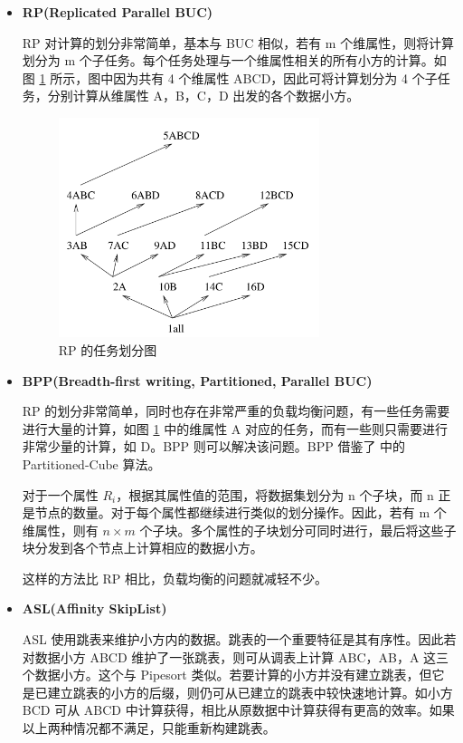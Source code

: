 \begin{itemize}

\item \textbf{RP(Replicated Parallel BUC)}

RP 对计算的划分非常简单，基本与 BUC 相似，若有 m 个维属性，则将计算划分为 m 个子任务。每个任务处理与一个维属性相关的所有小方的计算。如图 \ref{cluster_rp} 所示，图中因为共有 4 个维属性 ABCD，因此可将计算划分为 4 个子任务，分别计算从维属性 A，B，C，D 出发的各个数据小方。

\begin{figure}[!htb]
\centering\includegraphics[width=3in]{picture/ch_current_research/cluster_rp} 
\caption{RP 的任务划分图}\label{cluster_rp} 
\end{figure} 

\item \textbf{BPP(Breadth-first writing, Partitioned, Parallel BUC)}

RP 的划分非常简单，同时也存在非常严重的负载均衡问题，有一些任务需要进行大量的计算，如图 \ref{cluster_rp} 中的维属性 A 对应的任务，而有一些则只需要进行非常少量的计算，如 D。BPP 则可以解决该问题。BPP 借鉴了 \cite{ross1997fast} 中的 Partitioned-Cube 算法。

对于一个属性 ${R}_{i}$，根据其属性值的范围，将数据集划分为 n 个子块，而 n 正是节点的数量。对于每个属性都继续进行类似的划分操作。因此，若有 m 个维属性，则有 $n \times m$ 个子块。多个属性的子块划分可同时进行，最后将这些子块分发到各个节点上计算相应的数据小方。

这样的方法比 RP 相比，负载均衡的问题就减轻不少。

\item \textbf{ASL(Affinity SkipList)}

ASL 使用跳表来维护小方内的数据。跳表的一个重要特征是其有序性。因此若对数据小方 ABCD 维护了一张跳表，则可从调表上计算 ABC，AB，A 这三个数据小方。这个与 Pipesort 类似。若要计算的小方并没有建立跳表，但它是已建立跳表的小方的后缀，则仍可从已建立的跳表中较快速地计算。如小方 BCD 可从 ABCD 中计算获得，相比从原数据中计算获得有更高的效率。如果以上两种情况都不满足，只能重新构建跳表。
 

\end{itemize}
